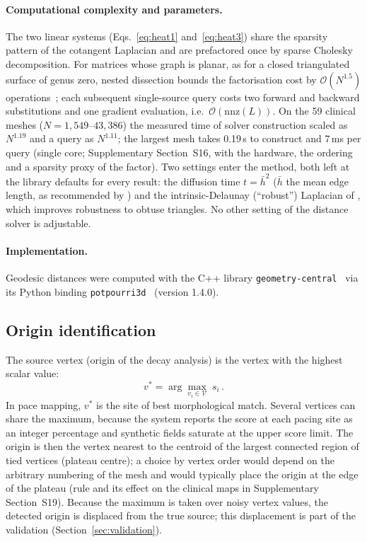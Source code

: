 \documentclass[a4paper,fleqn]{cas-dc}
\begin{document}
\paragraph{Computational complexity and parameters.}
The two linear systems (Eqs.~\ref{eq:heat1} and~\ref{eq:heat3}) share
the sparsity pattern of the cotangent Laplacian and are prefactored
once by sparse Cholesky decomposition.  For matrices whose graph is
planar, as for a closed triangulated surface of genus zero, nested
dissection bounds the factorisation cost by $\mathcal{O}(N^{1.5})$
operations~\citep{george1973, lipton1979}; each subsequent single-source
query costs two forward and backward substitutions and one gradient
evaluation, i.e.\ $\mathcal{O}(\mathrm{nnz}(L))$.  On the 59 clinical
meshes ($N = 1{,}549$--$43{,}386$) the measured time of solver
construction scaled as $N^{1.19}$ and a query as $N^{1.11}$; the
largest mesh takes 0.19\,s to construct and 7\,ms per query (single
core; Supplementary Section~S16, with the hardware, the ordering and a
sparsity proxy of the factor).  Two settings enter the method, both left
at the library defaults for every result: the diffusion time
$t = \bar{h}^2$ ($\bar{h}$ the mean edge length, as recommended by
\citet{crane2017}) and the intrinsic-Delaunay (``robust'') Laplacian of
\citet{sharp2020}, which improves robustness to obtuse triangles.
No other setting of the distance solver is adjustable.

\paragraph{Implementation.}
Geodesic distances were computed with the C++ library
\texttt{geometry-central}~\citep{sharp2019} via its Python binding
\texttt{potpourri3d}~\citep{sharp2021} (version 1.4.0).

\subsection{Origin identification}\label{sec:origin}

The source vertex (origin of the decay analysis) is the vertex with the
highest scalar value:
\begin{equation}
  v^* = \arg\max_{v_i \in \mathcal{V}}\; s_i\,.
  \label{eq:origin}
\end{equation}
In pace mapping, $v^*$ is the site of best morphological match.  Several
vertices can share the maximum, because the system reports the score at
each pacing site as an integer percentage and synthetic fields saturate
at the upper score limit.  The origin is then the vertex nearest to the
centroid of the largest connected region of tied vertices (plateau
centre); a choice by vertex order would depend on the arbitrary
numbering of the mesh and would typically place the origin at the edge
of the plateau (rule and its effect on the clinical maps in
Supplementary Section~S19).  Because the maximum is taken over noisy
vertex values, the detected origin is displaced from the true source;
this displacement is part of the validation
(Section~\ref{sec:validation}).
\end{document}
